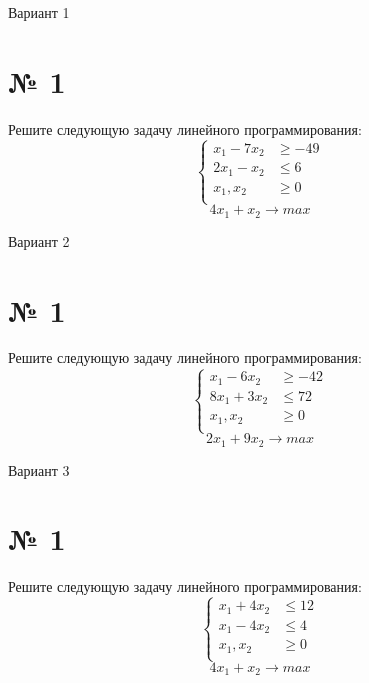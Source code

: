 \documentclass{article}%
\begin{document}
%
\normalsize%
\begin{center}%
\begin{Huge}%
Вариант 1%
\end{Huge}%
\end{center}%
\section*{№ 1}%
\label{sec:1}%
Решите следующую задачу линейного программирования: %
\[%
\left\{\begin{aligned}x_{1}-7x_{2} & \ge-49 \\2x_{1}-x_{2} & \le6 \\x_{1},x_{2} & \ge 0 \\\end{aligned}\right.%
\]%
\[%
4x_{1}+x_{2}  \to max%
\]

%
\newpage%
\begin{center}%
\begin{Huge}%
Вариант 2%
\end{Huge}%
\end{center}%
\section*{№ 1}%
\label{sec:1}%
Решите следующую задачу линейного программирования: %
\[%
\left\{\begin{aligned}x_{1}-6x_{2} & \ge-42 \\8x_{1}+3x_{2} & \le72 \\x_{1},x_{2} & \ge 0 \\\end{aligned}\right.%
\]%
\[%
2x_{1}+9x_{2}  \to max%
\]

%
\newpage%
\begin{center}%
\begin{Huge}%
Вариант 3%
\end{Huge}%
\end{center}%
\section*{№ 1}%
\label{sec:1}%
Решите следующую задачу линейного программирования: %
\[%
\left\{\begin{aligned}x_{1}+4x_{2} & \le12 \\x_{1}-4x_{2} & \le4 \\x_{1},x_{2} & \ge 0 \\\end{aligned}\right.%
\]%
\[%
4x_{1}+x_{2}  \to max%
\]
\end{document}

